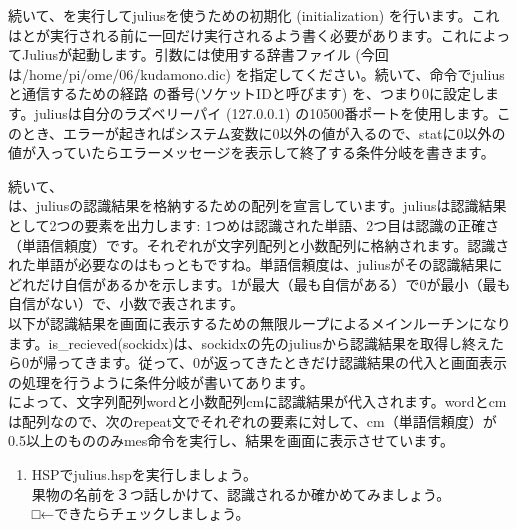 続いて、を実行してjuliusを使うための初期化 (initialization) を行います。これはとが実行される前に一回だけ実行されるよう書く必要があります。これによってJuliusが起動します。引数には使用する辞書ファイル (今回は/home/pi/ome/06/kudamono.dic) を指定してください。続いて、命令でjuliusと通信するための経路 の番号(ソケットIDと呼びます) を、つまり0に設定します。juliusは自分のラズベリーパイ (127.0.0.1) の10500番ポートを使用します。このとき、エラーが起きればシステム変数に0以外の値が入るので、statに0以外の値が入っていたらエラーメッセージを表示して終了する条件分岐を書きます。

続いて、\\
は、juliusの認識結果を格納するための配列を宣言しています。juliusは認識結果として2つの要素を出力します: 1つめは認識された単語、2つ目は認識の正確さ（単語信頼度）です。それぞれが文字列配列と小数配列に格納されます。認識された単語が必要なのはもっともですね。単語信頼度は、juliusがその認識結果にどれだけ自信があるかを示します。1が最大（最も自信がある）で0が最小（最も自信がない）で、小数で表されます。\\
以下が認識結果を画面に表示するための無限ループによるメインルーチンになります。is\_recieved(sockidx)は、sockidxの先のjuliusから認識結果を取得し終えたら0が帰ってきます。従って、0が返ってきたときだけ認識結果の代入と画面表示の処理を行うように条件分岐が書いてあります。\\
によって、文字列配列wordと小数配列cmに認識結果が代入されます。wordとcmは配列なので、次のrepeat文でそれぞれの要素に対して、cm（単語信頼度）が0.5以上のもののみmes命令を実行し、結果を画面に表示させています。\\
\begin{tcolorbox}[title=\useOmetoi]
\begin{enumerate}
\item HSPでjulius.hspを実行しましょう。\\果物の名前を３つ話しかけて、認識されるか確かめてみましょう。\\□←できたらチェックしましょう。
\end{enumerate}
\end{tcolorbox}
